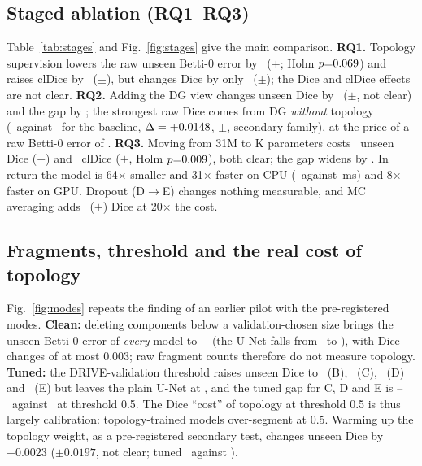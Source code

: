 \documentclass[conference]{IEEEtran}
\begin{document}
\subsection{Staged ablation (RQ1--RQ3)}
Table~\ref{tab:stages} and Fig.~\ref{fig:stages} give the main comparison. \textbf{RQ1.} Topology supervision lowers the raw unseen Betti-0 error by \dABBetti\ ($\pm$\ciABBetti; Holm $p{=}0.069$) and raises clDice by \dABCl\ ($\pm$\ciABCl), but changes Dice by only \dABDice\ ($\pm$\ciABDice); the Dice and clDice effects are not clear. \textbf{RQ2.} Adding the DG view changes unseen Dice by \dBCDice\ ($\pm$\ciBCDice, not clear) and the gap by \dBCGap; the strongest raw Dice comes from DG \emph{without} topology (\uDiceRawX\ against \uDiceRawA\ for the baseline, $\Delta=+0.0148$, $\pm$\ciAXDice, secondary family), at the price of a raw Betti-0 error of \uBettiRawX. \textbf{RQ3.} Moving from 31M to \compactParams K parameters costs \dCDDice\ unseen Dice ($\pm$\ciCDDice) and \dCDCl\ clDice ($\pm$\ciCDCl, Holm $p{=}0.009$), both clear; the gap widens by \dCDGap. In return the model is 64$\times$ smaller and 31$\times$ faster on CPU (\cpuE\ against \cpuA\,ms) and 8$\times$ faster on GPU. Dropout (D$\to$E) changes nothing measurable, and MC averaging adds \dMcDice\ ($\pm$\dMcDiceCi) Dice at 20$\times$ the cost.

\subsection{Fragments, threshold and the real cost of topology}
Fig.~\ref{fig:modes} repeats the finding of an earlier pilot with the pre-registered modes. \textbf{Clean:} deleting components below a validation-chosen size brings the unseen Betti-0 error of \emph{every} model to \uBettiCleanB--\uBettiCleanC\ (the U-Net falls from \uBettiRawA\ to \uBettiCleanA), with Dice changes of at most 0.003; raw fragment counts therefore do not measure topology. \textbf{Tuned:} the DRIVE-validation threshold raises unseen Dice to \uDiceTunedB\ (B), \uDiceTunedC\ (C), \uDiceTunedD\ (D) and \uDiceTunedE\ (E) but leaves the plain U-Net at \uDiceTunedA, and the tuned gap for C, D and E is \gapTunedC--\gapTunedD\ against \gapRawA\ at threshold 0.5. The Dice ``cost'' of topology at threshold 0.5 is thus largely calibration: topology-trained models over-segment at 0.5. Warming up the topology weight, as a pre-registered secondary test, changes unseen Dice by $+0.0023$ ($\pm0.0197$, not clear; tuned \uDiceTunedWarm\ against \uDiceTunedC).
\end{document}
